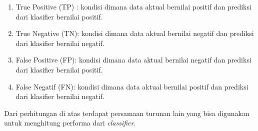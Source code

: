 \begin{enumerate}
	\item True Positive (TP) : kondisi dimana data aktual bernilai positif dan prediksi dari klasifier bernilai positif.
	\item True Negative (TN): kondisi dimana data aktual bernilai negatif dan prediksi dari klasifier bernilai negatif.
	\item False Positive (FP): kondisi dimana data aktual bernilai negatif dan prediksi dari klasifier bernilai positif.
	\item False Negatif (FN): kondisi dimana data aktual bernilai positif dan prediksi dari klasifier bernilai negatif.
\end{enumerate}

Dari perhitungan di atas terdapat persamaan turunan lain yang bisa digunakan untuk menghitung performa dari \textit{classifier}.

